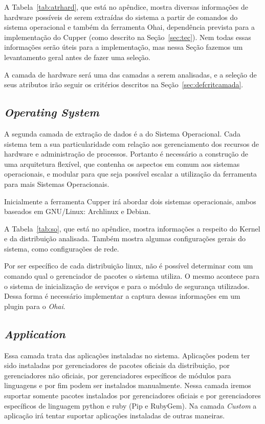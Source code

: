 A Tabela~\ref{tab:atrhard}, que está no apêndice,  mostra diversas informações 
de hardware possíveis de serem extraídas do sistema a partir de comandos 
do sistema operacional e também da ferramenta Ohai, 
dependência prevista para a implementação do Cupper (como descrito na 
Seção~\ref{sec:tec}). Nem todas essas informações serão úteis para a 
implementação, mas nessa Seção fazemos um levantamento geral antes de fazer uma
seleção.

A camada de hardware será uma das camadas a serem analisadas, e a seleção de 
seus atributos irão seguir os critérios descritos na 
Seção~\ref{sec:defcritcamada}.

\subsection{\textit{Operating System}}
\label{sec:cam-os}

A segunda camada de extração de dados é a do Sistema Operacional. 
Cada sistema tem a sua particularidade com relação aos gerenciamento dos 
recursos de hardware e administração de processos. Portanto é necessário a 
construção de uma arquitetura flexível, que contenha os aspectos em comum aos
sistemas operacionais, e modular para que seja possível escalar a utilização 
da ferramenta para mais Sistemas Operacionais.

Inicialmente a ferramenta Cupper irá abordar dois sistemas operacionais, 
ambos baseados em GNU/Linux: Archlinux e Debian.

A Tabela~\ref{tab:so}, que está no apêndice,
mostra informações a respeito do Kernel e da distribuição
analisada. Também mostra algumas configurações gerais do sistema, como
configurações de rede.

Por ser específico de cada distribuição linux, não é possível determinar com um
comando qual o gerenciador de pacotes o sistema utiliza. O mesmo acontece para
o sistema de inicialização de serviços e para o módulo de segurança utilizados.
Dessa forma é necessário implementar a captura dessas informações em um plugin 
para o \textit{Ohai}.

\subsection{\textit{Application}}

Essa camada trata das aplicações instaladas no sistema. Aplicações podem ter 
sido instaladas por gerenciadores de pacotes oficiais da distribuição, por
gerenciadores não oficiais, por gerenciadores específicos de módulos para
linguagens e por fim podem ser instalados manualmente. Nessa camada iremos 
suportar somente pacotes instalados por gerenciadores oficiais e por 
gerenciadores específicos de linguagem python e ruby (Pip e RubyGem). Na camada
\textit{Custom} a aplicação irá tentar suportar aplicações instaladas de outras
maneiras.


